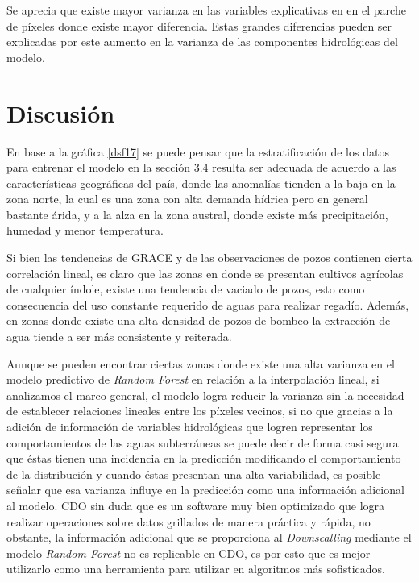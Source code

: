 Se aprecia que existe mayor varianza en las variables explicativas en en el parche de píxeles donde existe mayor diferencia. Estas grandes diferencias
pueden ser explicadas por este aumento en la varianza de las componentes hidrológicas del modelo.
%
%

\section{Discusión}

En base a la gráfica \ref{dsf17} se puede pensar que la estratificación de los datos para entrenar el modelo en la sección 3.4 resulta ser adecuada de acuerdo a las características geográficas del país, donde las anomalías
tienden a la baja en la zona norte, la cual es una zona con alta demanda hídrica pero en general bastante árida, y a la alza en la zona austral, donde existe más precipitación, humedad y menor temperatura.

Si bien las tendencias de GRACE y de las observaciones de pozos contienen cierta correlación lineal, es claro que las zonas en donde se presentan cultivos agrícolas de cualquier índole, existe una tendencia de vaciado de pozos, esto como consecuencia del
uso constante requerido de aguas para realizar regadío. Además, en zonas donde existe una alta densidad de pozos de bombeo la extracción de agua tiende a ser más consistente y reiterada.

Aunque se pueden encontrar ciertas zonas donde existe una alta varianza en el modelo predictivo de \textit{Random Forest} en relación a la interpolación lineal, si analizamos el marco general, el modelo logra reducir la varianza sin la necesidad de establecer relaciones lineales entre los píxeles vecinos, si no que gracias a
la adición de información de variables hidrológicas que logren representar los comportamientos de las aguas subterráneas se puede decir de forma casi segura que éstas tienen una incidencia en la predicción modificando el comportamiento de la distribución y cuando éstas presentan una alta variabilidad, es 
posible señalar que esa varianza influye en la predicción como una información adicional al modelo. CDO sin duda que es un software muy 
bien optimizado que logra realizar operaciones sobre datos grillados de manera práctica y rápida, no obstante, la información adicional que se proporciona 
al \textit{Downscalling} mediante el modelo \textit{Random Forest} no es replicable en CDO, es por esto que es mejor utilizarlo como una herramienta para utilizar en algoritmos más sofisticados. 

